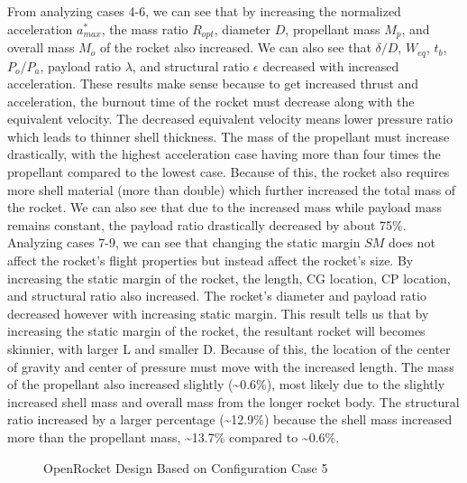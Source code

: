 \documentclass{report}
\begin{document}
\noindent From analyzing cases 4-6, we can see that by increasing the normalized acceleration $a^*_{max}$, the mass ratio $R_{opt}$, diameter $D$, propellant mass $M_p$, and overall mass $M_o$ of the rocket also increased.
We can also see that $\delta/D$, $W_{eq}$, $t_b$, $P_o/P_a$, payload ratio $\lambda$, and structural ratio $\epsilon$ decreased with increased acceleration.
These results make sense because to get increased thrust and acceleration, the burnout time of the rocket must decrease along with the equivalent velocity.
The decreased equivalent velocity means lower pressure ratio which leads to thinner shell thickness. 
The mass of the propellant must increase drastically, with the highest acceleration case having more than four times the propellant compared to the lowest case.
Because of this, the rocket also requires more shell material (more than double) which further increased the total mass of the rocket.
We can also see that due to the increased mass while payload mass remains constant, the payload ratio drastically decreased by about 75\%. \\

\noindent Analyzing cases 7-9, we can see that changing the static margin $SM$ does not affect the rocket's flight properties but instead affect the rocket's size.
By increasing the static margin of the rocket, the length, CG location, CP location, and structural ratio also increased.
The rocket's diameter and payload ratio decreased however with increasing static margin. 
This result tells us that by increasing the static margin of the rocket, the resultant rocket will becomes skinnier, with larger L and smaller D. 
Because of this, the location of the center of gravity and center of pressure must move with the increased length.
The mass of the propellant also increased slightly (\textasciitilde0.6\%), most likely due to the slightly increased shell mass and overall mass from the longer rocket body.
The structural ratio increased by a larger percentage (\textasciitilde12.9\%) because the shell mass increased more than the propellant mass, \textasciitilde13.7\% compared to \textasciitilde0.6\%.\\

\begin{figure}[h!]
    \centering
    \caption{OpenRocket Design Based on Configuration Case 5}
    \label{fig:rocketDesign}
\end{figure}
\end{document}
